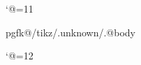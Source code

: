 

\catcode`@=11


\newtoks\kDEktropiToks

\expandafter\expandafter
\expandafter\kDEktropiToks
\expandafter\expandafter
\expandafter{\csname pgfk@/tikz/.unknown/.@body\endcsname}

\def\kDEktropiRestore{
  \def\kDAct{\pgfkeyssetvalue{/tikz/.unknown/.@body}}
  \expandafter\kDAct\expandafter{\the\kDEktropiToks}
  \def\kDAct{\long\def\kDAct####1\pgfeov}
  \expandafter\kDAct\expandafter{\the\kDEktropiToks}
  \pgfkeyslet{/tikz/.unknown/.@cmd}\kDAct
}

\catcode`@=12
